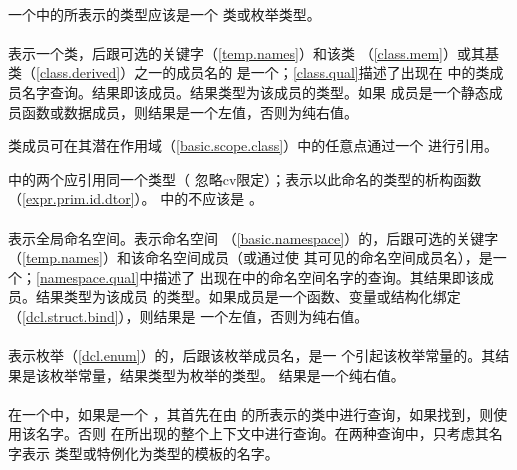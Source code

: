   \synprd{\tm{::}}

\paragraph{} %
一个中的所表示的类型应该是一个
类或枚举类型。

\paragraph{} %
表示一个类，后跟可选的关键字（\ref{temp.names}）和该类
（\ref{class.mem}）或其基类（\ref{class.derived}）之一的成员名的
是一个；\ref{class.qual}描述了出现在
中的类成员名字查询。结果即该成员。结果类型为该成员的类型。如果
成员是一个静态成员函数或数据成员，则结果是一个左值，否则为纯右值。

\begin{note}
  类成员可在其潜在作用域（\ref{basic.scope.class}）中的任意点通过一个
  进行引用。
\end{note}
\tm{::\tat}中的两个应引用同一个类型（
忽略cv限定）；表示以此命名的类型的析构函数（\ref{expr.prim.id.dtor}）。
中的不应该是
\tm{\tat}。

\paragraph{} %
 \tm{::}表示全局命名空间。表示命名空间
（\ref{basic.namespace}）的，后跟可选的关键字
（\ref{temp.names}）和该命名空间成员（或通过使
其可见的命名空间成员名），是一个；\ref{namespace.qual}中描述了
出现在中的命名空间名字的查询。其结果即该成员。结果类型为该成员
的类型。如果成员是一个函数、变量或结构化绑定（\ref{dcl.struct.bind}），则结果是
一个左值，否则为纯右值。

\paragraph{} %
表示枚举（\ref{dcl.enum}）的，后跟该枚举成员名，是一
个引起该枚举常量的。其结果是该枚举常量，结果类型为枚举的类型。
结果是一个纯右值。

\paragraph{} %
在一个中，如果是一个
，其首先在由
的所表示的类中进行查询，如果找到，则使用该名字。否则
在所出现的整个上下文中进行查询。在两种查询中，只考虑其名字表示
类型或特例化为类型的模板的名字。
